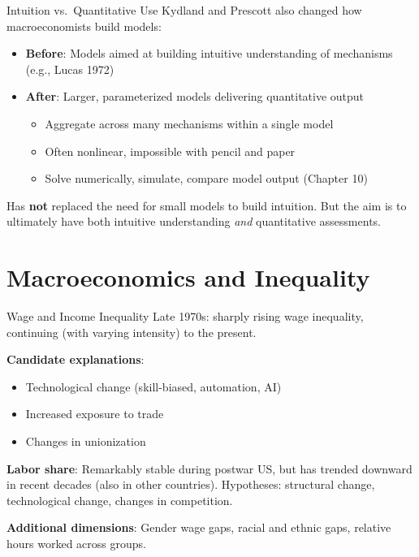 \documentclass[blue]{beamer}
\begin{document}
\begin{frame}{Intuition vs.\ Quantitative Use}
	Kydland and Prescott also changed how macroeconomists build models:
	
	\bigskip
	\begin{itemize}
		\item \textbf{Before}: Models aimed at building intuitive understanding of mechanisms (e.g., Lucas 1972)
		\item \textbf{After}: Larger, parameterized models delivering quantitative output
		\begin{itemize}
			\item Aggregate across many mechanisms within a single model
			\item Often nonlinear, impossible with pencil and paper
			\item Solve numerically, simulate, compare model output (Chapter 10)
		\end{itemize}
	\end{itemize}
	
	\bigskip
	Has \textbf{not} replaced the need for small models to build intuition. But the aim is to ultimately have both intuitive understanding \emph{and} quantitative assessments.
\end{frame}

\section{Macroeconomics and Inequality}

\begin{frame}{Wage and Income Inequality}
	Late 1970s: sharply rising wage inequality, continuing (with varying intensity) to the present.
	

	\textbf{Candidate explanations}:
		\vspace{-6pt}
	\begin{itemize}
		\item Technological change (skill-biased, automation, AI)
		\item Increased exposure to trade
		\item Changes in unionization
	\end{itemize}
	

	\textbf{Labor share}: Remarkably stable during postwar US, but has trended downward in recent decades (also in other countries). Hypotheses: structural change, technological change, changes in competition.
	

	\textbf{Additional dimensions}: Gender wage gaps, racial and ethnic gaps, relative hours worked across groups.
\end{frame}
\end{document}
